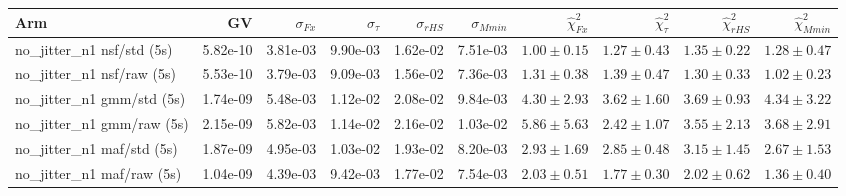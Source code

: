 \begin{tabular}{lrrrrrrrrr}
\toprule
Arm & GV & $\sigma_{Fx}$ & $\sigma_{\tau}$ & $\sigma_{rHS}$ & $\sigma_{Mmin}$ & $\hat\chi^2_{Fx}$ & $\hat\chi^2_{\tau}$ & $\hat\chi^2_{rHS}$ & $\hat\chi^2_{Mmin}$ \\
\midrule
no_jitter_n1 nsf/std (5s) & 5.82e-10 & 3.81e-03 & 9.90e-03 & 1.62e-02 & 7.51e-03 & $1.00\pm0.15$ & $1.27\pm0.43$ & $1.35\pm0.22$ & $1.28\pm0.47$ \\
no_jitter_n1 nsf/raw (5s) & 5.53e-10 & 3.79e-03 & 9.09e-03 & 1.56e-02 & 7.36e-03 & $1.31\pm0.38$ & $1.39\pm0.47$ & $1.30\pm0.33$ & $1.02\pm0.23$ \\
no_jitter_n1 gmm/std (5s) & 1.74e-09 & 5.48e-03 & 1.12e-02 & 2.08e-02 & 9.84e-03 & $4.30\pm2.93$ & $3.62\pm1.60$ & $3.69\pm0.93$ & $4.34\pm3.22$ \\
no_jitter_n1 gmm/raw (5s) & 2.15e-09 & 5.82e-03 & 1.14e-02 & 2.16e-02 & 1.03e-02 & $5.86\pm5.63$ & $2.42\pm1.07$ & $3.55\pm2.13$ & $3.68\pm2.91$ \\
no_jitter_n1 maf/std (5s) & 1.87e-09 & 4.95e-03 & 1.03e-02 & 1.93e-02 & 8.20e-03 & $2.93\pm1.69$ & $2.85\pm0.48$ & $3.15\pm1.45$ & $2.67\pm1.53$ \\
no_jitter_n1 maf/raw (5s) & 1.04e-09 & 4.39e-03 & 9.42e-03 & 1.77e-02 & 7.54e-03 & $2.03\pm0.51$ & $1.77\pm0.30$ & $2.02\pm0.62$ & $1.36\pm0.40$ \\
\bottomrule
\end{tabular}
